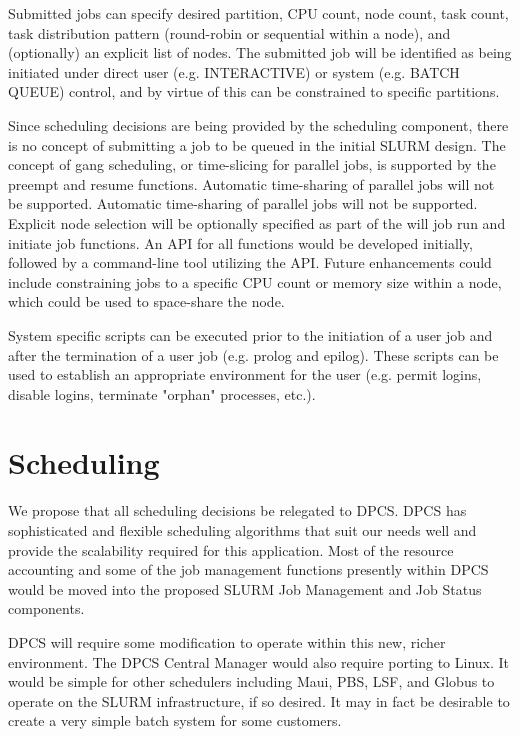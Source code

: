 Submitted jobs can specify desired partition, CPU count, node count, task 
count, task distribution pattern (round-robin or sequential within a node), 
and (optionally) an explicit list of nodes. The submitted job will be 
identified as being initiated under direct user (e.g. INTERACTIVE) or system 
(e.g. BATCH QUEUE) control, and by virtue of this can be constrained 
to specific partitions. 

Since scheduling decisions are being provided by the scheduling component,
there is no concept of submitting a job to be queued in the initial SLURM design. 
The concept of gang scheduling, or time-slicing for parallel jobs, is supported by the preempt and
resume functions. Automatic time-sharing of parallel jobs will not be
supported. Automatic time-sharing of parallel jobs will not be
supported. Explicit node selection will be optionally specified as part of the
will job run and initiate job functions. An API for all functions would be
developed initially, followed by a  command-line tool utilizing the API. Future
enhancements could include constraining jobs to a specific CPU count or memory
size within a node, which could be used to space-share the node.

System specific scripts can be executed prior to the initiation of a user job
and after the termination of a user job (e.g. prolog and epilog). These scripts
can be used to establish an appropriate environment for the user (e.g. permit
logins, disable logins, terminate "orphan" processes, etc.). 

\section{Scheduling}

We propose that all scheduling decisions be relegated to DPCS. DPCS has
sophisticated and flexible scheduling algorithms that suit our needs well and
provide the scalability required for this application. Most of the resource
accounting and some of the job management functions presently within DPCS would
be moved into the proposed SLURM Job Management and Job Status components. 

DPCS will require some modification to operate within this new, richer
environment. The DPCS Central Manager would also require porting to Linux. It
would be simple for other schedulers including Maui, PBS, LSF, and Globus 
to operate on the SLURM infrastructure, if so desired. It may in fact be 
desirable to create a very simple batch system for some customers.

